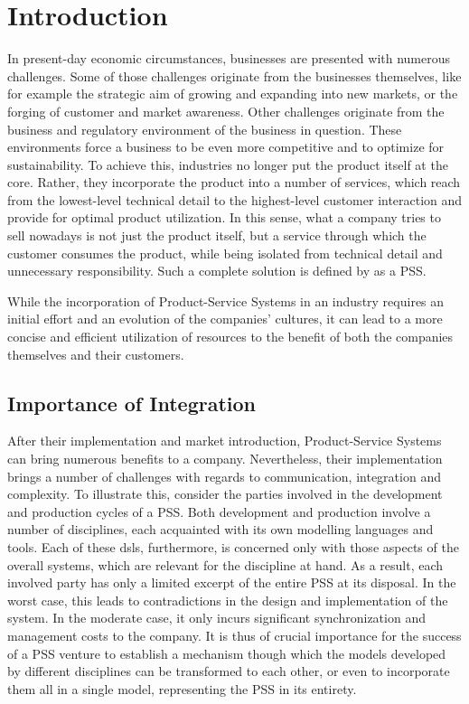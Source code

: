\chapter{Introduction}
\label{chap:intro}

In present-day economic circumstances, businesses are presented with numerous challenges. Some of those challenges originate from the businesses themselves, like for example the strategic aim of growing and expanding into new markets, or the forging of customer and market awareness. Other challenges originate from the business and regulatory environment of the business in question. These environments force a business to be even more competitive and to optimize for sustainability. To achieve this, industries no longer put the product itself at the core. Rather, they incorporate the product into a number of services, which reach from the lowest-level technical detail to the highest-level customer interaction and provide for optimal product utilization. In this sense, what a company tries to sell nowadays is not just the product itself, but a service through which the customer consumes the product, while being isolated from technical detail and unnecessary responsibility. Such a complete solution is defined by \cite{ref:schenkl} as a \gls{PSS}.

While the incorporation of Product-Service Systems in an industry requires an initial effort and an evolution of the companies' cultures, it can lead to a more concise and efficient utilization of resources to the benefit of both the companies themselves and their customers. 

\section*{Importance of Integration}

After their implementation and market introduction, Product-Service Systems can bring numerous benefits to a company. Nevertheless, their implementation brings a number of challenges with regards to communication, integration and complexity. To illustrate this, consider the parties involved in the development and production cycles of a \gls{PSS}. Both development and production involve a number of disciplines, each acquainted with its own modelling languages and tools. Each of these \glspl{dsl}, furthermore, is concerned only with those aspects of the overall systems, which are relevant for the discipline at hand. As a result, each involved party has only a limited excerpt of the entire \gls{PSS} at its disposal. In the worst case, this leads to contradictions in the design and implementation of the system. In the moderate case, it only incurs significant synchronization and management costs to the company. It is thus of crucial importance for the success of a PSS venture to establish a mechanism though which the models developed by different disciplines can be transformed to each other, or even to incorporate them all in a single model, representing the \gls{PSS} in its entirety.

